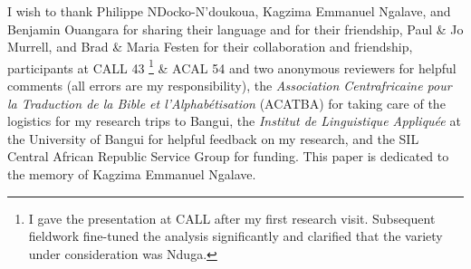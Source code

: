 \documentclass[output=paper,colorlinks,citecolor=brown
]{langscibook}
\begin{document}
I wish to thank Philippe NDocko-N’doukoua, Kagzima Emmanuel Ngalave, and Benjamin Ouangara for sharing their language and for their friendship, Paul \& Jo Murrell, and Brad \& Maria Festen for their collaboration and friendship, participants at CALL 43 \citep{olson2013}\footnote{I gave the presentation at CALL after my first research visit. Subsequent fieldwork fine-tuned the analysis significantly and clarified that the variety under consideration was Nduga.} \& ACAL 54 and two anonymous reviewers for helpful comments (all errors are my responsibility), the \textit{Association Centrafricaine pour la Traduction de la Bible et l’Alphabétisation} (ACATBA) for taking care of the logistics for my research trips to Bangui, the \textit{Institut de Linguistique Appliquée} at the University of Bangui for helpful feedback on my research, and
the SIL Central African Republic Service Group for funding. This paper is dedicated to the memory of Kagzima Emmanuel Ngalave.

\sloppy %

\printbibliography[heading=subbibliography,notkeyword=this]
\end{document}
